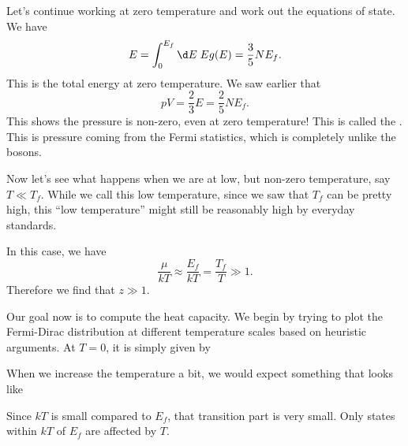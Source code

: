 \documentclass[a4paper]{article}
\begin{document}
Let's continue working at zero temperature and work out the equations of state. We have
\[
  E = \int_0^{E_f} \d E\; E g(E) = \frac{3}{5}NE_f.
\]
This is the total energy at zero temperature. We saw earlier that
\[
  pV = \frac{2}{3} E = \frac{2}{5} N E_f.
\]
This shows the pressure is non-zero, even at zero temperature! This is called the . This is pressure coming from the Fermi statistics, which is completely unlike the bosons.

Now let's see what happens when we are at low, but non-zero temperature, say $T \ll T_f$. While we call this low temperature, since we saw that $T_f$ can be pretty high, this ``low temperature'' might still be reasonably high by everyday standards.

In this case, we have
\[
  \frac{\mu}{kT} \approx \frac{E_f}{kT} = \frac{T_f}{T} \gg 1.
\]
Therefore we find that $z \gg 1$.

Our goal now is to compute the heat capacity. We begin by trying to plot the Fermi-Dirac distribution at different temperature scales based on heuristic arguments. At $T = 0$, it is simply given by
\begin{center}
\end{center}
When we increase the temperature a bit, we would expect something that looks like
\begin{center}
\end{center}
Since $kT$ is small compared to $E_f$, that transition part is very small. Only states within $kT$ of $E_f$ are affected by $T$.
\end{document}
